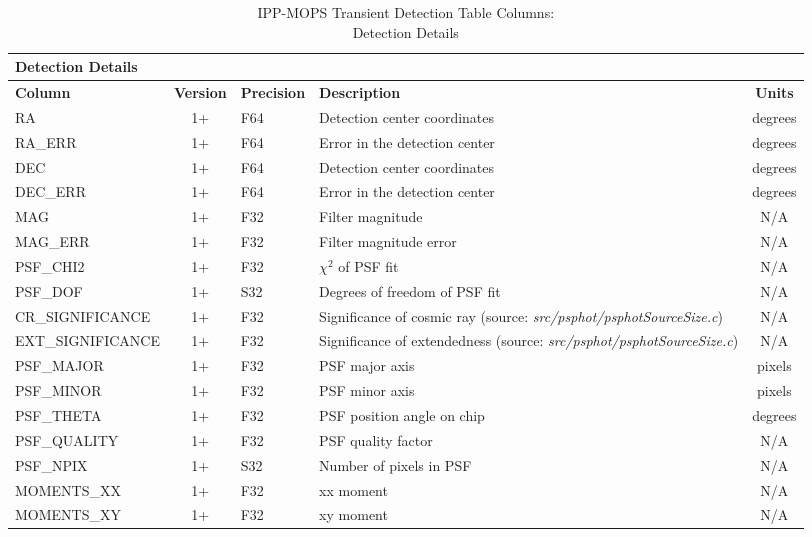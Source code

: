 \documentclass[panstarrs,spec]{panstarrs}
\begin{document}
\begin{center}
  \begin{longtable}{|lclp{3.5in}c|}
    \caption{IPP-MOPS Transient Detection Table Columns:\\ Detection Details}\label{table-detections}\\
    \hline \hline
    \multicolumn{5}{|l|}{\null\hspace{10mm}\textbf{Detection Details}}\\
    \hline \hline
    {\bf Column} & \textbf{Version} & {\bf Precision} & {\bf Description} & \textbf{Units}\\
    \hline
    RA & 1+ & F64 & Detection center coordinates & degrees\\
    \hline
    RA\_ERR & 1+ & F64 & Error in the detection center & degrees \\
    \hline
    DEC & 1+ & F64 & Detection center coordinates & degrees \\
    \hline
    DEC\_ERR & 1+ & F64 & Error in the detection center & degrees \\
    \hline
    MAG & 1+ & F32 & Filter magnitude & N/A \\
    \hline
    MAG\_ERR & 1+ & F32 & Filter magnitude error & N/A  \\
    \hline
    PSF\_CHI2 & 1+ & F32 & $\chi^2$ of PSF fit & N/A \\
    \hline
    PSF\_DOF & 1+ & S32 & Degrees of freedom of PSF fit & N/A  \\
    \hline
    CR\_SIGNIFICANCE & 1+ & F32 & Significance of cosmic ray (source: \emph{src/psphot/psphotSourceSize.c}) & N/A  \\
    \hline
    EXT\_SIGNIFICANCE & 1+ & F32 & Significance of extendedness (source: \emph{src/psphot/psphotSourceSize.c}) & N/A  \\
    \hline
    PSF\_MAJOR & 1+ & F32 & PSF major axis & pixels \\
    \hline
    PSF\_MINOR & 1+ & F32 & PSF minor axis & pixels \\
    \hline
    PSF\_THETA & 1+ & F32 & PSF position angle on chip & degrees \\
    \hline
    PSF\_QUALITY & 1+ & F32 & PSF quality factor & N/A \\
    \hline
    PSF\_NPIX & 1+ & S32 & Number of pixels in PSF & N/A \\
    \hline
    MOMENTS\_XX & 1+ & F32 & xx moment & N/A \\
    \hline
    MOMENTS\_XY & 1+ & F32 & xy moment & N/A \\

\end{longtable}
\end{center}
\end{document}
